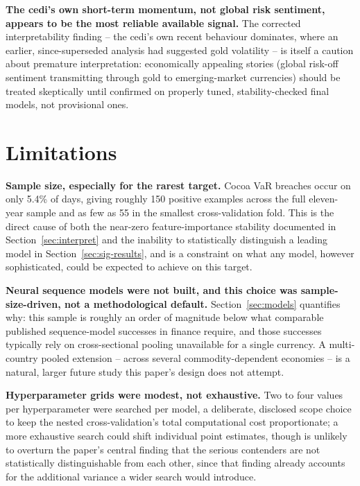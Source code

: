 \documentclass[final,3p,times,authoryear]{elsarticle}
\begin{document}
\textbf{The cedi's own short-term momentum, not global risk sentiment,
appears to be the most reliable available signal.} The corrected
interpretability finding -- the cedi's own recent behaviour dominates,
where an earlier, since-superseded analysis had suggested gold
volatility -- is itself a caution about premature interpretation:
economically appealing stories (global risk-off sentiment transmitting
through gold to emerging-market currencies) should be treated skeptically
until confirmed on properly tuned, stability-checked final models, not
provisional ones.

\section{Limitations}
\label{sec:limitations}

\textbf{Sample size, especially for the rarest target.} Cocoa VaR
breaches occur on only 5.4\% of days, giving roughly 150 positive
examples across the full eleven-year sample and as few as 55 in the
smallest cross-validation fold. This is the direct cause of both the
near-zero feature-importance stability documented in
Section~\ref{sec:interpret} and the inability to statistically
distinguish a leading model in Section~\ref{sec:sig-results}, and is a
constraint on what any model, however sophisticated, could be expected
to achieve on this target.

\textbf{Neural sequence models were not built, and this choice was
sample-size-driven, not a methodological default.} Section~\ref{sec:models}
quantifies why: this sample is roughly an order of magnitude below what
comparable published sequence-model successes in finance require, and
those successes typically rely on cross-sectional pooling unavailable
for a single currency. A multi-country pooled extension -- across
several commodity-dependent economies -- is a natural, larger future
study this paper's design does not attempt.

\textbf{Hyperparameter grids were modest, not exhaustive.} Two to four
values per hyperparameter were searched per model, a deliberate,
disclosed scope choice to keep the nested cross-validation's total
computational cost proportionate; a more exhaustive search could shift
individual point estimates, though is unlikely to overturn the paper's
central finding that the serious contenders are not statistically
distinguishable from each other, since that finding already accounts for
the additional variance a wider search would introduce.
\end{document}
